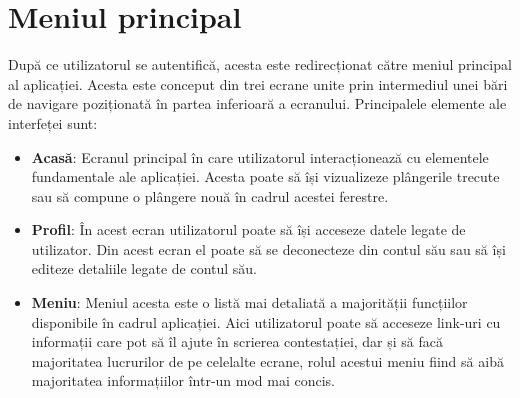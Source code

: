 \documentclass[12pt,a4paper]{report}
\theoremstyle{definition}
\theoremstyle{remark}
\begin{document}
\section{Meniul principal}
\vspace{20pt}
După ce utilizatorul se autentifică, acesta este redirecționat către meniul principal al aplicației. Acesta este conceput din trei ecrane unite prin intermediul unei bări de navigare poziționată în partea inferioară a ecranului. Principalele elemente ale interfeței sunt:
\begin{itemize}
  \item \textbf{Acasă}: Ecranul principal în care utilizatorul interacționează cu elementele fundamentale ale aplicației. Acesta poate să își vizualizeze plângerile trecute sau să compune o plângere nouă în cadrul acestei ferestre.
  \item \textbf{Profil}: În acest ecran utilizatorul poate să își acceseze datele legate de utilizator. Din acest ecran el poate să se deconecteze din contul său sau să își editeze detaliile legate de contul său. 
  \item \textbf{Meniu}: Meniul acesta este o listă mai detaliată a majorității funcțiilor disponibile în cadrul aplicației. Aici utilizatorul poate să acceseze link-uri cu informații care pot să îl ajute în scrierea contestației, dar și să facă majoritatea lucrurilor de pe celelalte ecrane, rolul acestui meniu fiind să aibă majoritatea informațiilor într-un mod mai concis.
\end{itemize}
\end{document}
